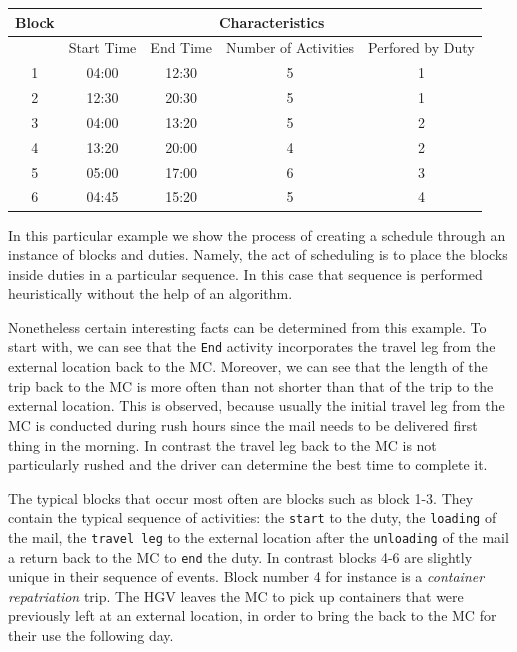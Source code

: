 \begin{table}[h]
\small
    \centering 
    \begin{tabular}{|c|c|c|c|c|}
        \hline
        \textbf{Block} & \multicolumn{4}{|c|}{ \textbf{Characteristics}} \\
        \hline
        & Start Time & End Time & Number of Activities & Perfored by Duty\\
        \hline
        1 & 04:00 & 12:30 & 5 & 1\\
        \hline
        2 & 12:30 & 20:30 & 5 & 1\\
        \hline
        3 & 04:00 & 13:20  & 5 & 2\\
        \hline
        4 & 13:20 & 20:00 & 4 & 2\\
        \hline
        5 & 05:00 & 17:00 & 6 & 3\\
        \hline
        6 & 04:45 & 15:20 & 5 & 4\\
        \hline
    \end{tabular}%
    \medbreak
\end{table}

\vspace{\baselineskip}
\noindent
In this particular example we show the process of creating a schedule through an instance of blocks and duties. Namely, the act of scheduling is to place the blocks inside duties in a particular sequence. In this case that sequence is performed heuristically without the help of an algorithm.

\vspace{\baselineskip}
\noindent
Nonetheless certain interesting facts can be determined from this example. To start with, we can see that the \texttt{End} activity incorporates the travel leg from the external location back to the MC. Moreover, we can see that the length of the trip back to the MC is more often than not shorter than that of the trip to the external location. This is observed, because usually the initial travel leg from the MC is conducted during rush hours since the mail needs to be delivered first thing in the morning. In contrast the travel leg back to the MC is not particularly rushed and the driver can determine the best time to complete it. 

\vspace{\baselineskip}
\noindent
The typical blocks that occur most often are blocks such as block 1-3. They contain the typical sequence of activities: the \texttt{start} to the duty, the \texttt{loading} of the mail, the \texttt{travel leg} to the external location after the \texttt{unloading} of the mail a return back to the MC to \texttt{end} the duty. In contrast  blocks 4-6 are slightly unique in their sequence of events. Block number 4 for instance is a \textit{container repatriation} trip. The HGV leaves the MC to pick up containers that were previously left at an external location, in order to bring the back to the MC for their use the following day.


